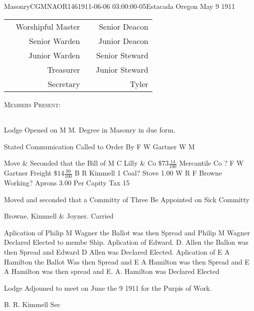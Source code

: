 MasonryCGMNAOR1461911-06-06 03:00:00-05Estacada Oregon May 9 1911\\
  \begin{center}
         \begin{tabular}{|l r|l r|}
             \hline
                                           & Worshipful Master &                               & Senior Deacon     \\
                                           & Senior Warden     &                               & Junior Deacon     \\
                                           & Junior Warden     &                               & Senior Steward    \\
                                           & Treasurer         &                               & Junior Steward    \\
                                           & Secretary         &                               & Tyler             \\
             \hline
         \end{tabular}
      \end{center}

     \textsc{Members Present:}

     \begin{tabular}{|l|}
     \end{tabular}

     Lodge Opened on M  M. Degree in Masonry in due form.

     Stated Communication Called to Order
     By F W Gartner W M

     Move \& Seconded that the Bill of
     M C Lilly & Co $\$73\tfrac{14}{100}$ Mercantile Co ?
     F W Gartner Freight $\$14\tfrac{99}{100}$ B R Kimmell
     1 Coal? Stove 1.00
     W R F Browne Working? Aprons 3.00
     Per Capity Tax 15

     Moved and seconded that a Committy of
     Three Be Appointed on Sick Committy

     Browne, Kimmell \& Joyner. Carried

     Aplication of Philip M Wagner
     the Ballot was then Spread and
     Philip M Wagner Declared Elected to
     membe Ship. Aplication of
     Edward. D. Allen the Ballon was then
     Spread and Edward D Allen was Declared
     Elected. Aplication of E A Hamilton
     the Ballot Was then Spread and E A
     Hamilton was then Spread and E A
     Hamilton was then spread and
     E. A. Hamilton was Declared Elected

     Lodge Adjouned to meet on June the 9
     1911 for the Purpis of Work.

                   B. R. Kimmell
                           Sec
 
